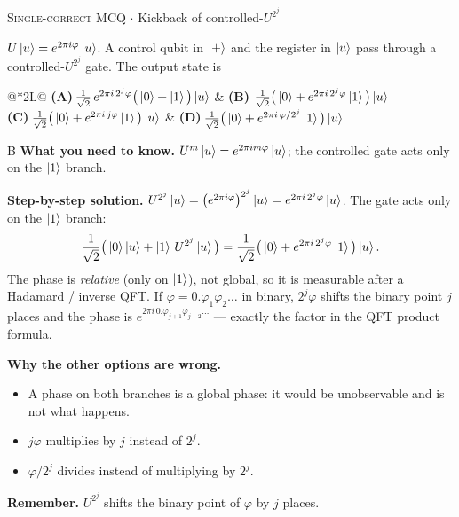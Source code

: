 \documentclass[11pt,a4paper]{article}
\newcommand{\optlabel}[1]{\textbf{(#1)}}
\newcommand{\correctlabel}[1]{\textcolor{okgreen}{\textbf{(#1)}\,\ding{51}}}
\newenvironment{qitem}[1]{\begin{list}{}{\setlength{\leftmargin}{3.3em}\setlength{\labelwidth}{3.1em}%
  \setlength{\labelsep}{0.2em}\setlength{\topsep}{3pt}\setlength{\parsep}{3pt}}\item[\textbf{Q.#1}\hfill]}{\end{list}}
\newcommand{\qsep}{\par\vspace{2pt}{\color{black!15}\hrule}\vspace{4pt}}
\newcommand{\qmeta}[2]{{\footnotesize\color{black!60}\textsc{#1} \;$\cdot$\; #2}\par}
\begin{document}
\begin{qitem}{28}
\qmeta{Single-correct MCQ}{Kickback of controlled-$U^{2^j}$}
$U\ket{u} = e^{2\pi i\varphi}\ket{u}$. A control qubit in $\ket{+}$ and the register in $\ket{u}$ pass through a
controlled-$U^{2^j}$ gate. The output state is
\par\smallskip\noindent\begin{tabularx}{\linewidth}{@{}*{2}{L}@{}}
\optlabel{A}\,$\frac{1}{\sqrt2}\,e^{2\pi i\,2^j\varphi}\big(\ket0 + \ket1\big)\ket{u}$ & \correctlabel{B}\,$\frac{1}{\sqrt2}\big(\ket0 + e^{2\pi i\,2^j\varphi}\ket1\big)\ket{u}$ \\[3pt]
\optlabel{C}\,$\frac{1}{\sqrt2}\big(\ket0 + e^{2\pi i\,j\varphi}\ket1\big)\ket{u}$ & \optlabel{D}\,$\frac{1}{\sqrt2}\big(\ket0 + e^{2\pi i\,\varphi/2^j}\ket1\big)\ket{u}$
\end{tabularx}
\end{qitem}
\begin{solbox}{B}
\textbf{\color{brand}What you need to know.} $U^{m}\ket u = e^{2\pi i m\varphi}\ket u$; the controlled gate acts only on the $\ket1$ branch.

\textbf{\color{brand}Step-by-step solution.} $U^{2^j}\ket{u} = \big(e^{2\pi i\varphi}\big)^{2^j}\ket{u} = e^{2\pi i\,2^j\varphi}\ket{u}$. The gate acts only on the $\ket1$ branch:
\[ \frac{1}{\sqrt2}\big(\ket0\ket u + \ket1\,U^{2^j}\ket u\big) = \frac{1}{\sqrt2}\big(\ket0 + e^{2\pi i\,2^j\varphi}\ket1\big)\ket u. \]
The phase is \emph{relative} (only on $\ket1$), not global, so it is measurable after a Hadamard / inverse QFT. If
$\varphi = 0.\varphi_1\varphi_2\dots$ in binary, $2^j\varphi$ shifts the binary point $j$ places and the phase is
$e^{2\pi i\,0.\varphi_{j+1}\varphi_{j+2}\dots}$ --- exactly the factor in the QFT product formula.

\textbf{\color{brand}Why the other options are wrong.}
\begin{itemize}[leftmargin=2.4em, itemsep=1pt, topsep=2pt]
\item[\textbf{(A)}] A phase on both branches is a global phase: it would be unobservable and is not what happens.
\item[\textbf{(C)}] $j\varphi$ multiplies by $j$ instead of $2^j$.
\item[\textbf{(D)}] $\varphi/2^j$ divides instead of multiplying by $2^j$.
\end{itemize}
\textbf{\color{brand}Remember.} $U^{2^j}$ shifts the binary point of $\varphi$ by $j$ places.
\end{solbox}
\qsep
\end{document}
